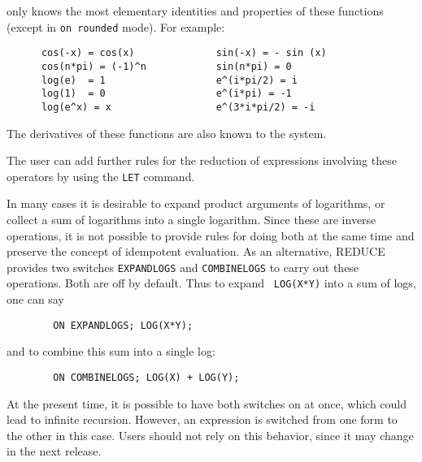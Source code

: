 {\REDUCE} only knows the most elementary identities and properties
of these functions (except in {\tt on rounded} mode).  For example:
\begin{verbatim}
      cos(-x) = cos(x)              sin(-x) = - sin (x)
      cos(n*pi) = (-1)^n            sin(n*pi) = 0
      log(e)  = 1                   e^(i*pi/2) = i
      log(1)  = 0                   e^(i*pi) = -1
      log(e^x) = x                  e^(3*i*pi/2) = -i
\end{verbatim}

The derivatives of these functions are also known to the system.

The user can add further rules for the reduction of expressions involving
these operators by using the {\tt LET} command.


In many cases it is desirable to expand product arguments of logarithms,
or collect a sum of logarithms into a single logarithm.  Since these are
inverse operations, it is not possible to provide rules for doing both at
the same time and preserve the {\REDUCE} concept of idempotent evaluation.
As an alternative, REDUCE provides two switches {\tt EXPANDLOGS}
 and {\tt COMBINELOGS} to carry
out these operations.  Both are off by default.  Thus to expand {\tt
LOG(X*Y)} into a sum of logs, one can say
\begin{verbatim}
        ON EXPANDLOGS; LOG(X*Y);
\end{verbatim}
and to combine this sum into a single log:
\begin{verbatim}
        ON COMBINELOGS; LOG(X) + LOG(Y);
\end{verbatim}

At the present time, it is possible to have both switches on at once,
which could lead to infinite recursion.  However, an expression is
switched from one form to the other in this case.  Users should not rely
on this behavior, since it may change in the next release.

